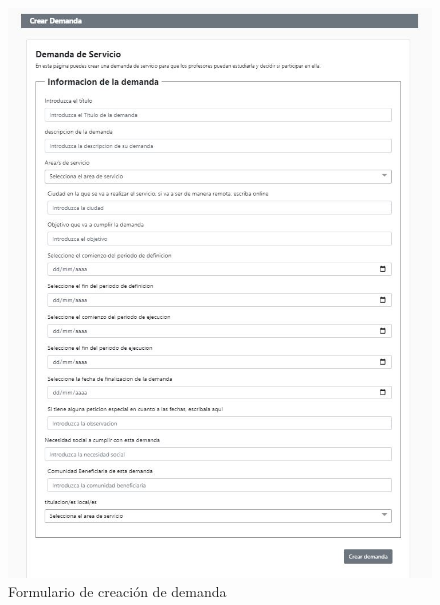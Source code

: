 \documentclass[11pt]{article}
\begin{document}
\begin{figure}
	\centering
	\includegraphics[scale=0.9]{demanda}
	\caption{Formulario de creación de demanda}
\end{figure}
\end{document}
